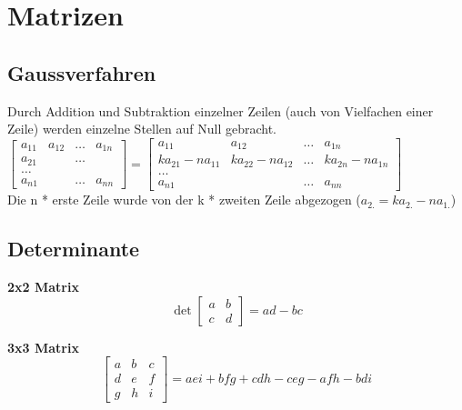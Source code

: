 \section{Matrizen}
\subsection{Gaussverfahren}
Durch Addition und Subtraktion einzelner Zeilen (auch von Vielfachen einer
Zeile) werden einzelne Stellen auf Null gebracht.\\
\vspace{1.0pt}
$\begin{bmatrix}
a_{11} & a_{12}& \ldots & a_{1n}\\
a_{21}& &\ldots & \\
\ldots \\
a_{n1} & & \ldots & a_{nn}    			
\end{bmatrix}=
\begin{bmatrix}
a_{11} & a_{12}& \ldots & a_{1n}\\
k a_{21}-n a_{11}& ka_{22}-n a_{12}&\ldots & k a_{2n} - n a_{1n}\\
\ldots \\
a_{n1} & & \ldots & a_{nn}    			
\end{bmatrix}$ \\
\vspace{1.0pt}
Die n * erste Zeile wurde von der k * zweiten Zeile abgezogen ($a_{2.}= 
k a_{2.}- n a_{1.}$)

\subsection{Determinante}
\begin{minipage}[t]{6cm}
	\textbf{2x2 Matrix}    
	\[ \det \begin{bmatrix}
	a & b \\
	c & d
	\end{bmatrix} = ad - bc \]
\end{minipage}
\begin{minipage}[t]{12cm}
	\textbf{3x3 Matrix}
	\[\begin{bmatrix}
	a & b & c \\
	d & e & f \\
	g & h & i 
	\end{bmatrix} = aei + bfg + cdh - ceg - afh - bdi \]
\end{minipage}


